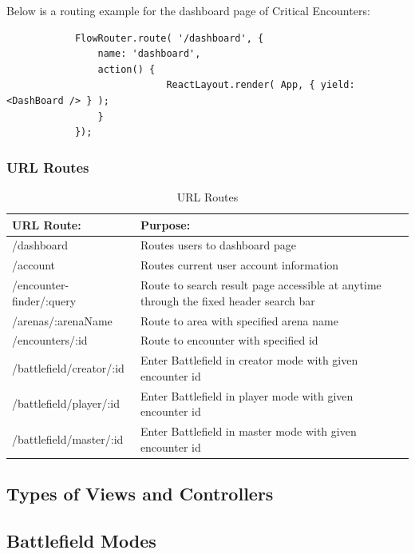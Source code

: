 \documentclass[12pt,a4paper]{report}
\begin{document}
		Below is a routing example for the dashboard page of Critical Encounters:
		
		\begin{lstlisting}
			FlowRouter.route( '/dashboard', {
				name: 'dashboard',
				action() {
							ReactLayout.render( App, { yield: <DashBoard /> } );
				}
			});
		\end{lstlisting}
		
		\subsubsection { URL Routes}
		
			\begin{table}[H]
				\begin{center}
					\begin{tabular}{ |p{5cm}|p{7cm}|| } 
						\hline
						URL Route: & Purpose: \\
						\hline
						/dashboard & Routes users to dashboard page \\
						/account & Routes current user account information\\
						/encounter-finder/:query & Route to search result page accessible at anytime through the fixed header search bar  \\
						/arenas/:arenaName & Route to area with specified arena name  \\
						/encounters/:id & Route to encounter with specified id \\
						/battlefield/creator/:id & Enter Battlefield in creator mode with given encounter id \\
						/battlefield/player/:id & Enter Battlefield in player mode with given encounter id \\
						/battlefield/master/:id & Enter Battlefield in master mode with given encounter id \\	
						\hline
					\end{tabular}
				\end{center}
			\caption{URL Routes} \label{table: URL Routes}
		\end{table}
		
		
	\subsection{Types of Views and Controllers}
	\subsection{Battlefield Modes}
\end{document}
